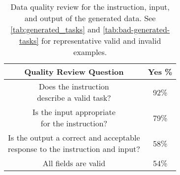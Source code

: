 \begin{table}[h]
\small
  \setlength\doublerulesep{\arrayrulewidth} %
\centering
\begin{tabular}{|c|c|}
\toprule
Quality Review Question                                   & Yes \% \\ 
\midrule \midrule
\makecell[c]{Does the instruction \\ describe a valid task? }               &   92\%  \\ \midrule
\makecell[c]{Is the input appropriate \\ for the instruction?}               &   79\% \\ \midrule
\makecell[c]{Is the output a correct and acceptable \\ response to the instruction and input?} &   58\%  \\ \midrule
\midrule
All fields are valid                                        &  54\%   \\ \bottomrule
\end{tabular}
\caption{Data quality review for the instruction, input, and output of the generated data. See \autoref{tab:generated_tasks} and \autoref{tab:bad-generated-tasks} for representative valid and invalid examples.
}
\label{tab:data_quality_eval}
\end{table}
